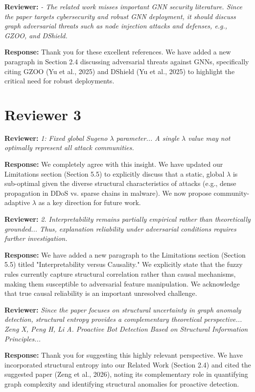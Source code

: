 \documentclass[11pt]{article}
\newcommand{\reviewer}[1]{\vspace{1em}\noindent\textbf{Reviewer: }\textit{#1}\vspace{0.5em}}
\newcommand{\response}[1]{\noindent\textbf{Response: }#1}
\begin{document}
\reviewer{- The related work misses important GNN security literature. Since the paper targets cybersecurity and robust GNN deployment, it should discuss graph adversarial threats such as node injection attacks and defenses, e.g., GZOO, and DShield.}

\response{Thank you for these excellent references. We have added a new paragraph in Section 2.4 discussing adversarial threats against GNNs, specifically citing GZOO (Yu et al., 2025) and DShield (Yu et al., 2025) to highlight the critical need for robust deployments.}


\section*{Reviewer 3}

\reviewer{1: Fixed global Sugeno $\lambda$ parameter... A single $\lambda$ value may not optimally represent all attack communities.}

\response{We completely agree with this insight. We have updated our Limitations section (Section 5.5) to explicitly discuss that a static, global $\lambda$ is sub-optimal given the diverse structural characteristics of attacks (e.g., dense propagation in DDoS vs. sparse chains in malware). We now propose community-adaptive $\lambda$ as a key direction for future work.}

\reviewer{2. Interpretability remains partially empirical rather than theoretically grounded... Thus, explanation reliability under adversarial conditions requires further investigation.}

\response{We have added a new paragraph to the Limitations section (Section 5.5) titled "Interpretability versus Causality." We explicitly state that the fuzzy rules currently capture structural correlation rather than causal mechanisms, making them susceptible to adversarial feature manipulation. We acknowledge that true causal reliability is an important unresolved challenge.}

\reviewer{Since the paper focuses on structural uncertainty in graph anomaly detection, structural entropy provides a complementary theoretical perspective... Zeng X, Peng H, Li A. Proactive Bot Detection Based on Structural Information Principles...}

\response{Thank you for suggesting this highly relevant perspective. We have incorporated structural entropy into our Related Work (Section 2.4) and cited the suggested paper (Zeng et al., 2026), noting its complementary role in quantifying graph complexity and identifying structural anomalies for proactive detection.}
\end{document}
